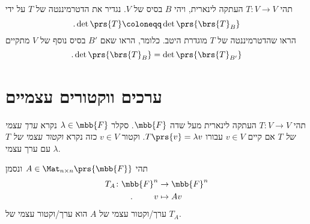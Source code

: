 \documentclass[a4paper,10pt,twoside,openany]{article}
\begin{document}
\begin{exercise}
תהי
$T \colon V \to V$
העתקה לינארית, ויהי
$B$
בסיס של
$V$.
נגדיר את הדטרמיננטה של
$T$
על ידי
\[\text{.}\det\prs{T} \coloneqq \det\prs{\brs{T}_B}\]
הראו שהדטרמיננטה של
$T$
מוגדרת היטב. כלומר, הראו שאם
$B'$
בסיס נוסף של
$V$
מתקיים
\[\text{.} \det\prs{\brs{T}_B} = \det\prs{\brs{T}_{B'}}\]
\end{exercise}

\section{ערכים ווקטורים עצמיים}

\begin{definition}
תהי
$T \colon V \to V$
העתקה לינארית מעל שדה
$\mbb{F}$.
סקלר
$\lambda \in \mbb{F}$
נקרא
\emph{ערך עצמי של
$T$}
אם קיים
$v \in V$
עבורו
$T\prs{v} = \lambda v$.
וקטור
$v \in V$
כזה נקרא
\emph{וקטור עצמי של
$T$}
עם ערך עצמי
$\lambda$.

תהי
$A \in \Mat_{n \times n}\prs{\mbb{F}}$
ונסמן
\begin{align*}
T_A \colon \mbb{F}^n &\to \mbb{F}^n \\
\text{.} \hphantom{lalala} v &\mapsto Av
\end{align*}
ערך/וקטור
עצמי של
$A$
הוא
ערך/וקטור
עצמי של
$T_A$.
\end{definition}
\end{document}
